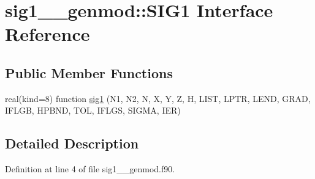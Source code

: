 \hypertarget{interfacesig1____genmod_1_1SIG1}{\section{sig1\+\_\+\+\_\+genmod\+:\+:S\+I\+G1 Interface Reference}
\label{interfacesig1____genmod_1_1SIG1}
}
\subsection*{Public Member Functions}
\begin{DoxyCompactItemize}
\item 
real(kind=8) function \hyperlink{interfacesig1____genmod_1_1SIG1_afd132f3d65d04e89aa7fdc1248aeb915}{sig1} (N1, N2, N, X, Y, Z, H, L\+I\+S\+T, L\+P\+T\+R, L\+E\+N\+D, G\+R\+A\+D, I\+F\+L\+G\+B, H\+P\+B\+N\+D, T\+O\+L, I\+F\+L\+G\+S, S\+I\+G\+M\+A, I\+E\+R)
\end{DoxyCompactItemize}


\subsection{Detailed Description}


Definition at line 4 of file sig1\+\_\+\+\_\+genmod.\+f90.



